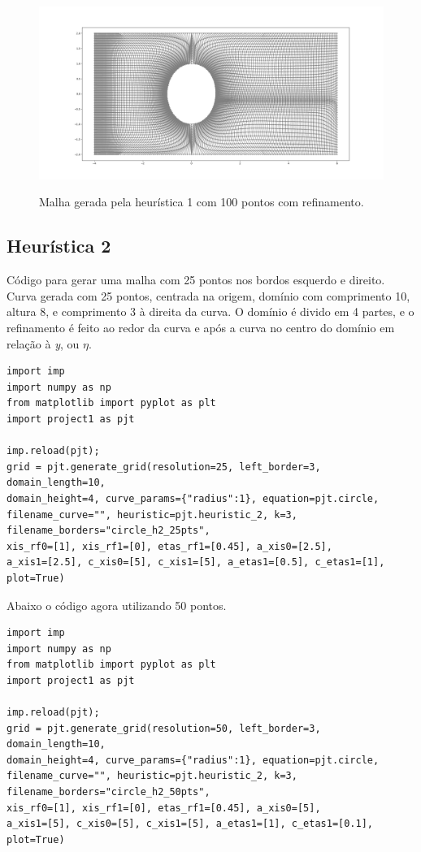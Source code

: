 \documentclass[a4paper]{article}
\begin{document}
\begin{figure}[H]
	\centering
	\includegraphics[width=1.0\textwidth]{heuristica_1_100pts_refined.png}
	\label{fig:heuristic1_100pts_refined} 
	\caption[caption]{Malha gerada pela heurística 1 com 100 pontos com refinamento.}
\end{figure}






\subsection{Heurística 2}



Código para gerar uma malha com 25 pontos nos bordos esquerdo e direito. Curva gerada com 25 pontos, centrada na origem, domínio com comprimento 10, altura 8, e comprimento 3 à direita da curva. O domínio é divido em 4 partes, e o refinamento é feito ao redor da curva e após a curva no centro do domínio em relação à \textit{y}, ou $\eta$.

\begin{verbatim}
import imp
import numpy as np
from matplotlib import pyplot as plt
import project1 as pjt

imp.reload(pjt);  
grid = pjt.generate_grid(resolution=25, left_border=3, domain_length=10, 
domain_height=4, curve_params={"radius":1}, equation=pjt.circle, 
filename_curve="", heuristic=pjt.heuristic_2, k=3, filename_borders="circle_h2_25pts", 
xis_rf0=[1], xis_rf1=[0], etas_rf1=[0.45], a_xis0=[2.5], 
a_xis1=[2.5], c_xis0=[5], c_xis1=[5], a_etas1=[0.5], c_etas1=[1], plot=True)
\end{verbatim}

Abaixo o código agora utilizando 50 pontos.
\begin{verbatim}
import imp
import numpy as np
from matplotlib import pyplot as plt
import project1 as pjt

imp.reload(pjt);  
grid = pjt.generate_grid(resolution=50, left_border=3, domain_length=10, 
domain_height=4, curve_params={"radius":1}, equation=pjt.circle, 
filename_curve="", heuristic=pjt.heuristic_2, k=3, filename_borders="circle_h2_50pts", 
xis_rf0=[1], xis_rf1=[0], etas_rf1=[0.45], a_xis0=[5], 
a_xis1=[5], c_xis0=[5], c_xis1=[5], a_etas1=[1], c_etas1=[0.1], plot=True)
\end{verbatim}
\end{document}
